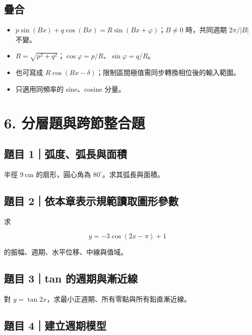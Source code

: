 \documentclass[11pt,a4paper]{article}
\providecommand{\tightlist}{%
  \setlength{\itemsep}{0pt}\setlength{\parskip}{0pt}}
\begin{document}
\subsection{疊合}\label{ux758aux5408}

\begin{itemize}
\tightlist
\item
  \(p\sin(Bx)+q\cos(Bx)=R\sin(Bx+\varphi)\)；\(B\ne0\) 時，共同週期 \(2\pi/|B|\) 不變。
\item
  \(R=\sqrt{p^2+q^2}\)；\(\cos\varphi=p/R\)、\(\sin\varphi=q/R\)。
\item
  也可寫成 \(R\cos(Bx-\delta)\)；限制區間極值需同步轉換相位後的輸入範圍。
\item
  只適用同頻率的 sine、cosine 分量。
\end{itemize}

\section{6. 分層題與跨節整合題}\label{ux5206ux5c64ux984cux8207ux8de8ux7bc0ux6574ux5408ux984c}

\subsection{題目 1｜弧度、弧長與面積}\label{ux984cux76ee-1ux5f27ux5ea6ux5f27ux9577ux8207ux9762ux7a4d}

半徑 \(9\ \mathrm{cm}\) 的扇形，圓心角為 \(80^\circ\)。求其弧長與面積。

\subsection{題目 2｜依本章表示規範讀取圖形參數}\label{ux984cux76ee-2ux4f9dux672cux7ae0ux8868ux793aux898fux7bc4ux8b80ux53d6ux5716ux5f62ux53c3ux6578}

求

\[
y=-3\cos(2x-\pi)+1
\]

的振幅、週期、水平位移、中線與值域。

\subsection{題目 3｜tan 的週期與漸近線}\label{ux984cux76ee-3tan-ux7684ux9031ux671fux8207ux6f38ux8fd1ux7dda}

對 \(y=\tan2x\)，求最小正週期、所有零點與所有鉛直漸近線。

\subsection{題目 4｜建立週期模型}\label{ux984cux76ee-4ux5efaux7acbux9031ux671fux6a21ux578b}
\end{document}
